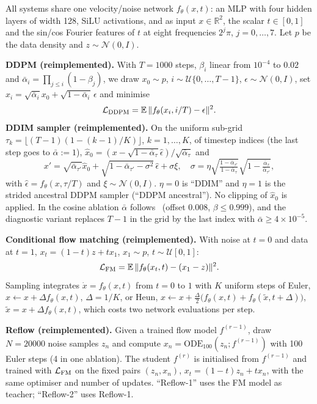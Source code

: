 All systems share one velocity/noise network $f_\theta(x,t)$: an MLP with four hidden layers of width 128, SiLU activations, and as input $x\in\mathbb R^2$, the scalar $t\in[0,1]$ and the sin/cos Fourier features of $t$ at eight frequencies $2^j\pi$, $j=0,\dots,7$. Let $p$ be the data density and $z\sim\mathcal N(0,I)$.

\textbf{DDPM (reimplemented).} With $T{=}1000$ steps, $\beta_i$ linear from $10^{-4}$ to $0.02$ and $\bar\alpha_i=\prod_{j\le i}(1-\beta_j)$, we draw $x_0\sim p$, $i\sim\mathcal U\{0,\dots,T{-}1\}$, $\epsilon\sim\mathcal N(0,I)$, set $x_i=\sqrt{\bar\alpha_i}x_0+\sqrt{1-\bar\alpha_i}\,\epsilon$ and minimise
\begin{equation}\mathcal L_{\rm DDPM}=\mathbb E\,\|f_\theta(x_i,i/T)-\epsilon\|^2 .\end{equation}
\textbf{DDIM sampler (reimplemented).} On the uniform sub-grid $\tau_k=\lfloor(T{-}1)(1-(k{-}1)/K)\rfloor$, $k=1,\dots,K$, of timestep indices (the last step goes to $\bar\alpha{:=}1$), $\hat x_0=(x-\sqrt{1-\bar\alpha_\tau}\hat\epsilon)/\sqrt{\bar\alpha_\tau}$ and
\begin{equation}x'=\sqrt{\bar\alpha_{\tau'}}\hat x_0+\sqrt{1-\bar\alpha_{\tau'}-\sigma^2}\,\hat\epsilon+\sigma\xi,\quad \sigma=\eta\sqrt{\tfrac{1-\bar\alpha_{\tau'}}{1-\bar\alpha_\tau}}\sqrt{1-\tfrac{\bar\alpha_\tau}{\bar\alpha_{\tau'}}},\end{equation}
with $\hat\epsilon=f_\theta(x,\tau/T)$ and $\xi\sim\mathcal N(0,I)$. $\eta{=}0$ is ``DDIM'' and $\eta{=}1$ is the strided ancestral DDPM sampler (``DDPM ancestral''). No clipping of $\hat x_0$ is applied. In the cosine ablation $\bar\alpha$ follows~\cite{nichol2021improved} (offset $0.008$, $\beta\le0.999$), and the diagnostic variant replaces $T{-}1$ in the grid by the last index with $\bar\alpha\ge4\times10^{-5}$.

\textbf{Conditional flow matching (reimplemented).} With noise at $t{=}0$ and data at $t{=}1$, $x_t=(1-t)z+tx_1$, $x_1\sim p$, $t\sim\mathcal U[0,1]$:
\begin{equation}\mathcal L_{\rm FM}=\mathbb E\,\|f_\theta(x_t,t)-(x_1-z)\|^2 .\end{equation}
Sampling integrates $\dot x=f_\theta(x,t)$ from $t{=}0$ to $1$ with $K$ uniform steps of Euler, $x\leftarrow x+\Delta f_\theta(x,t)$, $\Delta=1/K$, or Heun, $x\leftarrow x+\tfrac{\Delta}{2}\big(f_\theta(x,t)+f_\theta(\tilde x,t{+}\Delta)\big)$, $\tilde x=x+\Delta f_\theta(x,t)$, which costs two network evaluations per step.

\textbf{Reflow (reimplemented).} Given a trained flow model $f^{(r-1)}$, draw $N{=}20000$ noise samples $z_n$ and compute $x_n=\mathrm{ODE}_{100}(z_n;f^{(r-1)})$ with 100 Euler steps (4 in one ablation). The student $f^{(r)}$ is initialised from $f^{(r-1)}$ and trained with $\mathcal L_{\rm FM}$ on the fixed pairs $(z_n,x_n)$, $x_t=(1-t)z_n+tx_n$, with the same optimiser and number of updates. ``Reflow-1'' uses the FM model as teacher; ``Reflow-2'' uses Reflow-1.

